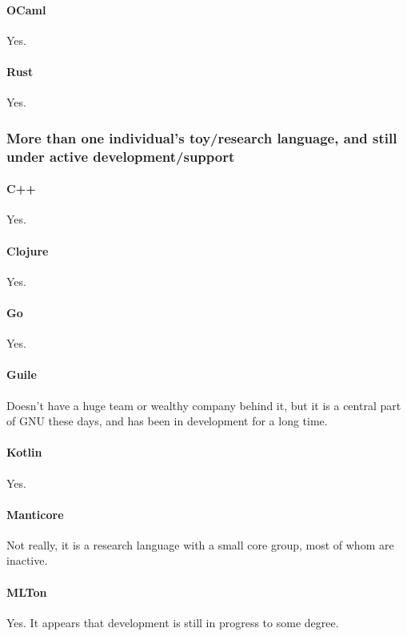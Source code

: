 \paragraph{OCaml}
Yes.

\paragraph{Rust}
Yes.

\subsubsection{More than one individual's toy/research language, and still under active development/support}

\paragraph{C++}
Yes.

\paragraph{Clojure}
Yes.

\paragraph{Go}
Yes.

\paragraph{Guile}
Doesn't have a huge team or wealthy company behind it, but it is a central part of GNU these days, and has been in development for a long time.

\paragraph{Kotlin}
Yes.

\paragraph{Manticore}
Not really, it is a research language with a small core group, most of whom are inactive.

\paragraph{MLTon}
Yes.  It appears that development is still in progress to some degree.

